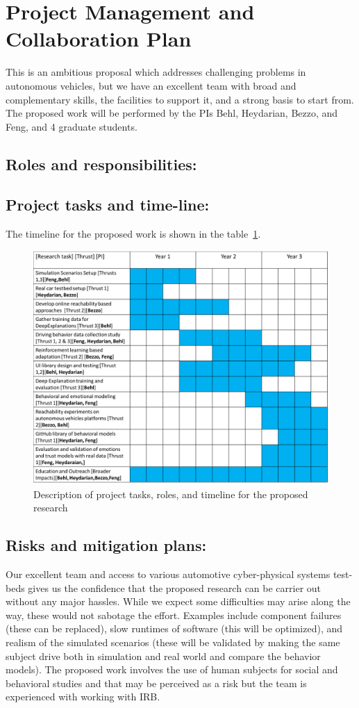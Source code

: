 \section{Project Management and Collaboration Plan}
\label{sec:plan}
This is an ambitious proposal which addresses challenging problems in autonomous vehicles, but we have an excellent team with broad and complementary skills, the facilities to support it, and a strong basis to start from.
The proposed work will be performed by the PIs Behl, Heydarian, Bezzo, and Feng, and 4 graduate students.

\subsection{Roles and responsibilities:}


\subsection{Project tasks and time-line:}

The timeline for the proposed work  is shown in the table~\ref{fig:gantt}.

\begin{figure}
    \centering
    \includegraphics[width=0.8\columnwidth]{figures/gantt_plan.png}
    \caption{Description of project tasks, roles, and timeline for the proposed research}
    \label{fig:gantt}
\end{figure}


\subsection{Risks and mitigation plans:}

Our excellent team and access to various automotive cyber-physical systems test-beds gives us the confidence that the proposed research can be carrier out without any major hassles. While we expect some difficulties may arise along the way, these would not sabotage the effort. Examples include component failures (these can be replaced), slow runtimes of software (this will be optimized), and realism of the simulated scenarios (these will be validated by making the same subject drive both in simulation and real world and compare the behavior models). The proposed work involves the use of human subjects for social and behavioral studies and that may be perceived as a risk but the team is experienced with working with IRB.

